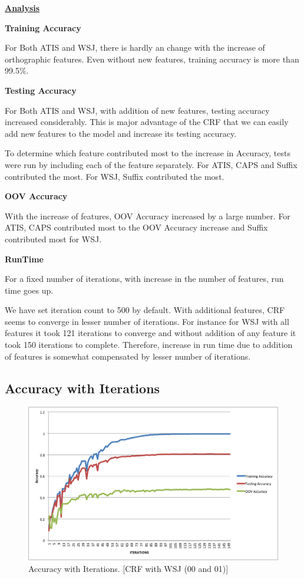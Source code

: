 \underline{\bfseries Analysis}

\textbf{Training Accuracy}

For Both ATIS and WSJ, there is hardly an change with the increase of orthographic features. Even without new features, training accuracy is more than 99.5\%.

\textbf{Testing Accuracy}

For Both ATIS and WSJ, with addition of new features, testing accuracy increased considerably. This is major advantage of the CRF that we can easily add new features to the model and increase its testing accuracy.

To determine which feature contributed most to the increase in Accuracy, tests were run by including each of the feature separately. For ATIS, CAPS and Suffix contributed the most. For WSJ, Suffix contributed the most.

\textbf{OOV Accuracy}

With the increase of features, OOV Accuracy increased by a large number. For ATIS, CAPS contributed most to the OOV Accuracy increase and Suffix contributed most for WSJ. 

\textbf{RunTime}

For a fixed number of iterations, with increase in the number of features, run time goes up. 

We have set iteration count to 500 by default. With additional features, CRF seems to converge in lesser number of iterations. For instance for WSJ with all features it took 121 iterations to converge and without addition of any feature it took 150 iterations to complete. Therefore, increase in run time due to addition of features is somewhat compensated by lesser number of iterations.

\subsection {Accuracy with Iterations}

\begin{figure}[ht!]
\centering
\includegraphics[width=120mm]{accuracy.png}
\caption{Accuracy with Iterations. [CRF with WSJ (00 and 01)]}
\label{accuracy}
\end{figure}

